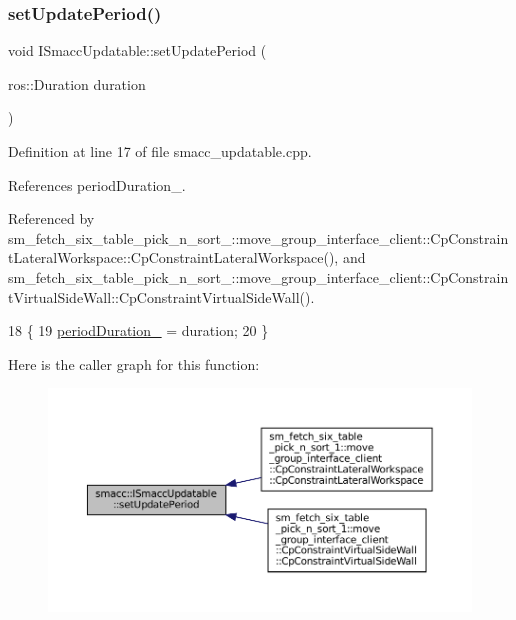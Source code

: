 \subsubsection{\texorpdfstring{set\+Update\+Period()}{setUpdatePeriod()}}
{\footnotesize\ttfamily void I\+Smacc\+Updatable\+::set\+Update\+Period (\begin{DoxyParamCaption}\item[{ros\+::\+Duration}]{duration }\end{DoxyParamCaption})}



Definition at line 17 of file smacc\+\_\+updatable.\+cpp.



References period\+Duration\+\_\+.



Referenced by sm\+\_\+fetch\+\_\+six\+\_\+table\+\_\+pick\+\_\+n\+\_\+sort\+\_\+::move\+\_\+group\+\_\+interface\+\_\+client\+::\+Cp\+Constraint\+Lateral\+Workspace\+::\+Cp\+Constraint\+Lateral\+Workspace(), and sm\+\_\+fetch\+\_\+six\+\_\+table\+\_\+pick\+\_\+n\+\_\+sort\+\_\+::move\+\_\+group\+\_\+interface\+\_\+client\+::\+Cp\+Constraint\+Virtual\+Side\+Wall\+::\+Cp\+Constraint\+Virtual\+Side\+Wall().


\begin{DoxyCode}
18 \{
19     \hyperlink{classsmacc_1_1ISmaccUpdatable_ad02d9798ac5609f3ecb9fb8a46febc18}{periodDuration\_} = duration;
20 \}
\end{DoxyCode}
Here is the caller graph for this function\+:
\nopagebreak
\begin{figure}[H]
\begin{center}
\leavevmode
\includegraphics[width=350pt]{classsmacc_1_1ISmaccUpdatable_a88f3b092a81b2d8810a9776c8c69855b_icgraph}
\end{center}
\end{figure}
\mbox{\label{classsmacc_1_1ISmaccUpdatable_a84ee0520cbefdb1d412bed54650b028e}} 
